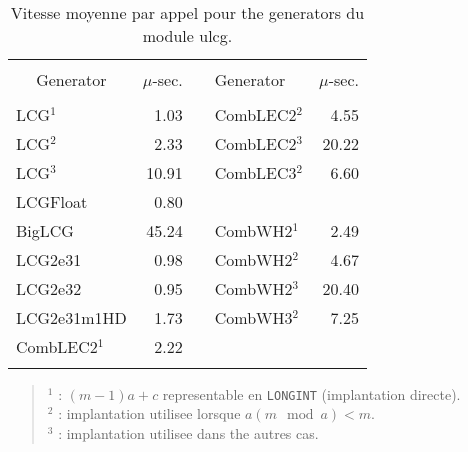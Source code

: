 \begin{table}[htb] \centering \tt
\caption {\rm Vitesse moyenne par appel pour the generators 
          du module ulcg.}
\label {vitesse1}
\begin{tabular}{|l|r|c|l|r|}
\hline
&&&&\\
\multicolumn{1}{|c|}{\rm Generator} & $\mu$-sec. && {\rm Generator}
   & $\mu$-sec.\\
\hline \hline
&&&&\\
 LCG$^1$              &   1.03 && CombLEC2$^2$ &   4.55\\
 LCG$^2$              &   2.33 && CombLEC2$^3$ &  20.22\\
 LCG$^3$              &  10.91 && CombLEC3$^2$ &   6.60\\
 LCGFloat             &   0.80 &&              &  \\
 BigLCG               &  45.24 && CombWH2$^1$  &   2.49\\
 LCG2e31              &   0.98 && CombWH2$^2$  &   4.67\\            
 LCG2e32              &   0.95 && CombWH2$^3$  &  20.40\\            
 LCG2e31m1HD          &   1.73 && CombWH3$^2$  &   7.25\\          
 CombLEC2$^1$         &   2.22 &&              &       \\
&&&&\\
\hline
\end{tabular}

\begin {verse}
 $^1$ : $(m-1)a + c$ representable en {\tt LONGINT} (implantation directe).\\
 $^2$ : implantation utilisee lorsque $a (m\mod a) < m$.\\
 $^3$ : implantation utilisee dans the autres cas.\\
\end {verse}
\end {table}

